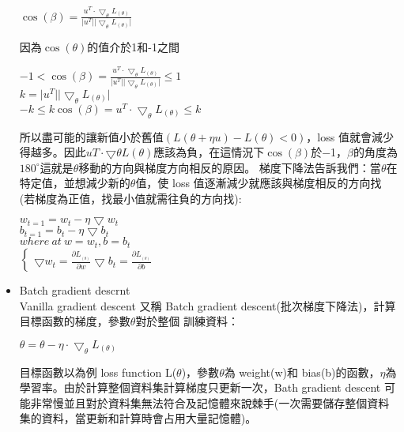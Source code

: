 \begin{itemize}
\begin{center}
$\cos(\beta)=\frac{u^{T}\cdot\bigtriangledown_{\theta} L_{(\theta)}}{\vert u^{T}\vert\vert \bigtriangledown_{\theta} L_{(\theta)}\vert}$\\
\end{center}
因為$\cos(\theta)$的值介於1和-1之間\\
\begin{center}
$-1<\cos(\beta)=\frac{u^{T}\cdot\bigtriangledown_{\theta} L_{(\theta)}}{\vert u^{T}\vert\vert \bigtriangledown_{\theta} L_{(\theta)}\vert}\leq 1$\\
$k=\vert u^{T}\vert\vert \bigtriangledown_{\theta} L_{(\theta)}\vert$\\
$-k \leq k\cos(\beta)=u^{T}\cdot\bigtriangledown_{\theta} L_{(\theta)}\leq k$
\end{center}
\newpage
 所以盡可能的讓新值小於舊值$(L(\theta+\eta u) − L(\theta) < 0)$，loss 值就會減少得越多。因此$u T \cdot \bigtriangledown\theta L(\theta)$應該為負，在這情況下$\cos(\beta)$於−1，$\beta$的角度為 $180^{\circ}$這就是$\theta$移動的方向與梯度方向相反的原因。 梯度下降法告訴我們：當$\theta$在特定值，並想減少新的$\theta$值，使 loss 值逐漸減少就應該與梯度相反的方向找 (若梯度為正值，找最小值就需往負的方向找):
\begin{center}
$w_{t=1}=w_t-\eta\bigtriangledown w_t$\\
$b_{t=1}=b_t-\eta\bigtriangledown b_t$\\
$where\ at\ w=w_t,b=b_t$\\
$\begin{cases}
 \bigtriangledown w_t=\frac{\partial L_{_{(\theta)}}}{\partial w}
 \bigtriangledown b_t=\frac{\partial L_{_{(\theta)}}}{\partial b}
 \end{cases}$
\end{center}
\item Batch gradient descrnt\\
 Vanilla gradient descent 又稱 Batch gradient descent(批次梯度下降法)，計算目標函數的梯度，參數$\theta$對於整個 訓練資料：
\begin{center}
$\theta=\theta-\eta\cdot\bigtriangledown_{\theta}L_{(\theta)}$
\end{center}
 目標函數以為例 loss function L($\theta$)，參數$\theta$為 weight(w)和 bias(b)的函數，$\eta$為學習率。由於計算整個資料集計算梯度只更新一次，Bath gradient descent 可能非常慢並且對於資料集無法符合及記憶體來說棘手(一次需要儲存整個資料集的資料，當更新和計算時會占用大量記憶體)。\\
\begin{lstlisting}[caption=\Large Batch gradient descrnt]

\end{lstlisting}
\end{itemize}
